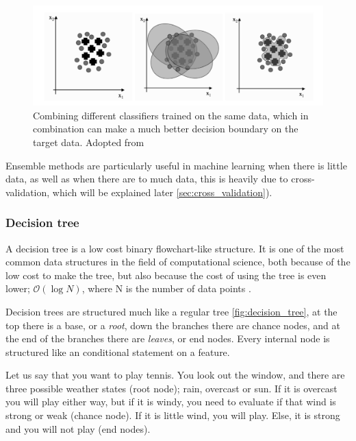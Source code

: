 \begin{figure}[h]
     \centering
     \includegraphics[width=\linewidth]{theory/figures/ensemble_learning.png}
     \caption{Combining different classifiers trained on the same data, which in combination can make a much better decision boundary on the target data. Adopted from \cite{marsland2014machine}}
     \label{fig:ensemble_learning}
\end{figure}	

Ensemble methods are particularly useful in machine learning when there is little data, as well as when there are to much data, this is heavily due to cross-validation, which will be explained later \ref{sec:cross_validation}).

\subsubsection{Decision tree}

A decision tree is a low cost binary flowchart-like structure. It is one of the most common data structures in the field of computational science, both because of the low cost to make the tree, but also because the cost of using the tree is even lower; $\mathcal{O}(\log{N})$, where N is the number of data points \cite{marsland2014machine}.

Decision trees are structured much like a regular tree \ref{fig:decision_tree}, at the top there is a base, or a \textit{root}, down the branches there are chance nodes, and at the end of the branches there are \textit{leaves}, or end nodes. Every internal node is structured like an conditional statement on a feature.

Let us say that you want to play tennis. You look out the window, and there are three possible weather states (root node); rain, overcast or sun. If it is overcast you will play either way, but if it is windy, you need to evaluate if that wind is strong or weak (chance node). If it is little wind, you will play. Else, it is strong and you will not play (end nodes).

